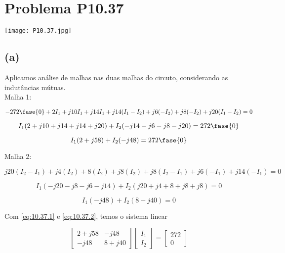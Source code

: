 
\section*{Problema P10.37}

\renewcommand*\thesection{10.37}

\begin{center}
    \texttt{[image: P10.37.jpg]}
\end{center}

\subsection*{(a)}

Aplicamos análise de malhas nas duas malhas do circuto, considerando as indutâncias mútuas. \\
Malha 1:

\[ - 272\fase{0} + 2I_1 + j10I_1 + j14I_1 + j14(I_1 - I_2) + j6(-I_2) + j8(-I_2) + j20(I_1 - I_2) = 0  \]

\[ I_1(2 + j10 + j14 + j14 + j20) + I_2(-j14 -j6 - j8 - j20) = 272\fase{0}  \]

\begin{equation}\label{eq:10.37.1}
    I_1(2 + j58) + I_2(-j48) = 272\fase{0}
\end{equation}

Malha 2:

\[ j20(I_2 - I_1) + j4(I_2) + 8(I_2) + j8(I_2) + j8(I_2 - I_1) + j6(-I_1) + j14(-I_1)  = 0 \]

\[ I_1(-j20 - j8 - j6 - j14) + I_2(j20 + j4 + 8 + j8 + j8)  = 0 \]

\begin{equation}\label{eq:10.37.2}
    I_1(-j48) + I_2(8 + j40) = 0
\end{equation}

Com \eqref{eq:10.37.1} e \eqref{eq:10.37.2}, temos o sistema linear

\begingroup
\renewcommand*{\arraystretch}{1.5}

\[
    \begin{bmatrix}
        2 + j58 & -j48    \\
        -j48    & 8 + j40
    \end{bmatrix}
    \begin{bmatrix}
        I_1 \\
        I_2
    \end{bmatrix}
    =
    \begin{bmatrix}
        272 \\
        0
    \end{bmatrix}
\]

